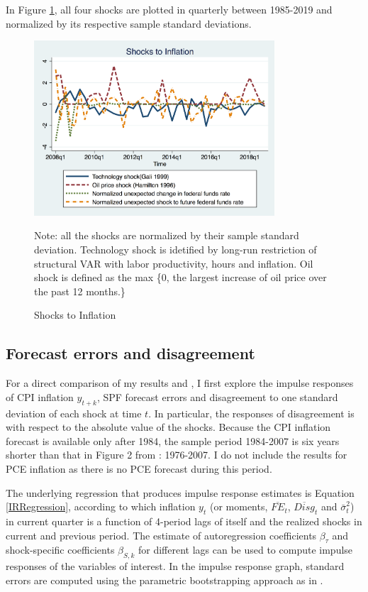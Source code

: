 \documentclass[12pt]{article}
\begin{document}
	
	In Figure \ref{Inflationshocks}, all four shocks are plotted in quarterly between 1985-2019 and normalized by its respective sample standard deviations. 
	
	\begin{figure}[ht]
		\centering
		\includegraphics[width=0.8\textwidth,totalheight=0.6\textwidth]{figures/inf_shocksQ.png}
			\begin{flushleft}
			{\footnotesize Note: all the shocks are normalized by their sample standard deviation. Technology shock is idetified by long-run restriction of structural VAR with labor productivity, hours and inflation. Oil shock is defined as the max \{0, the largest increase of oil price over the past 12 months.\} }
		\end{flushleft}
		\caption{ Shocks to Inflation}
		\label{Inflationshocks}
	\end{figure}
	
	\subsection{Forecast errors and disagreement}
	
	For a direct comparison of my results and \citet{coibion2012can}, I first explore the impulse responses of CPI inflation $y_{t+k}$, SPF forecast errors and disagreement to one standard deviation of each shock at time $t$. In particular, the responses of disagreement is with respect to the absolute value of the shocks. Because the CPI inflation forecast is available only after 1984, the sample period 1984-2007 is six years shorter than that in Figure 2 from \citet{coibion2012can}: 1976-2007. I do not include the results for PCE inflation as there is no PCE forecast during this period. 
	
	The underlying regression that produces impulse response estimates is  Equation \ref{IRRegression}, according to which inflation $y_t$ (or moments, $\overline {FE}_{t}$, $\overline{Disg}_t$ and $\bar \sigma^2_t$) in current quarter is a function of 4-period lags of itself and the realized shocks in current and previous period. The estimate of autoregression coefficients $\beta_\tau$ and shock-specific coefficients $\beta_{S,k}$ for different lags can be used to compute impulse responses of the variables of interest. In the impulse response graph, standard errors are computed using the parametric bootstrapping approach as in \citet{coibion2012can}. 
	
\end{document}
